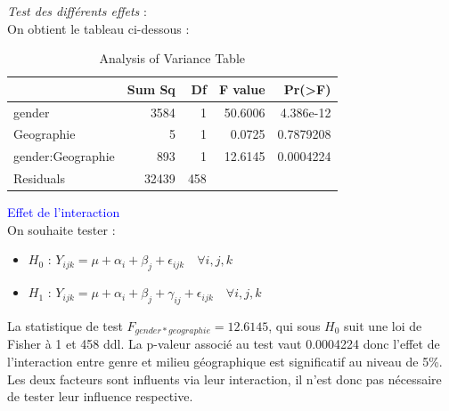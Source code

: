 \documentclass[12pt,a4paper]{article}
\begin{document}
	\textit{Test des différents effets} : \\
	On obtient le tableau ci-dessous : 
	\begin{table}[H]
		\centering
		\begin{tabular}{lrrrr}
			\toprule
			& Sum Sq & Df & F value & Pr(>F)     \\
			\midrule
			gender            & 3584   & 1  & 50.6006 & 4.386e-12  \\
			Geographie        & 5      & 1  & 0.0725  & 0.7879208  \\
			gender:Geographie & 893    & 1  & 12.6145 & 0.0004224  \\
			Residuals         & 32439  & 458 &         &            \\
			\bottomrule
		\end{tabular}
		\caption{Analysis of Variance Table}
	\end{table}
	\textcolor{blue}{Effet de l'interaction} \\
	On souhaite tester : 
	\begin{itemize}
		\item \textbf{$H_0$} : $Y_{ijk} = \mu + \alpha_i + \beta_j + \epsilon_{ijk} \quad \forall i,j,k$ 
		\item \textbf{$H_1$} : $Y_{ijk} = \mu + \alpha_i + \beta_j + \gamma_{ij} + \epsilon_{ijk} \quad \forall i,j,k$
	\end{itemize}
	La statistique de test $F_{gender*geographie} = 12.6145$, qui sous $H_0$ suit une loi de Fisher à 1 et 458 ddl. La p-valeur associé au test vaut 0.0004224 donc l'effet de l'interaction entre genre et milieu géographique est significatif au niveau de 5\%. Les deux facteurs sont influents via leur interaction, il n'est donc pas nécessaire de tester leur influence respective.\\
	
\end{document}
